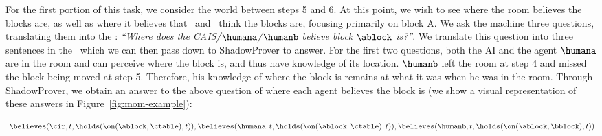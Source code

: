 For the first portion of this task, we consider the world between
steps 5 and 6.  At this point, we wish to see where the room believes
the blocks are, as well as where it believes that \humana\ and
\humanb\ think the blocks are, focusing primarily on block A.  We ask
the machine three questions, translating them into the \DCEC:
\emph{``Where does the CAIS/$\humana$/$\humanb$ believe block
  $\ablock$ is?''}.  We translate this question into three sentences
in the \DCEC\ which we can then pass down to \textsf{ShadowProver} to
answer.
For the first two questions, both the AI and the agent $\humana$ are
in the room and can perceive where the block is, and thus have
knowledge of its location.  $\humanb$ left the room at step 4 and
missed the block being moved at step 5.  Therefore, his knowledge of
where the block is remains at what it was when he was in the room. Through
\textsf{ShadowProver}, we obtain an answer to the above question
of where each agent believes the block is (we show a visual representation
of these answers in Figure~\ref{fig:mom-example}): 

\vspace{-0.1in}
\begin{footnotesize}
\begin{equation*}
\begin{aligned}\
{\believes(\cir, t, \holds(\on(\ablock, \ctable), t)), \believes(\humana, t, \holds(\on(\ablock, \ctable), t)),
\believes(\humanb, t, \holds(\on(\ablock, \bblock), t))}
\end{aligned}
\end{equation*}
\end{footnotesize}
\vspace{-0.15in}